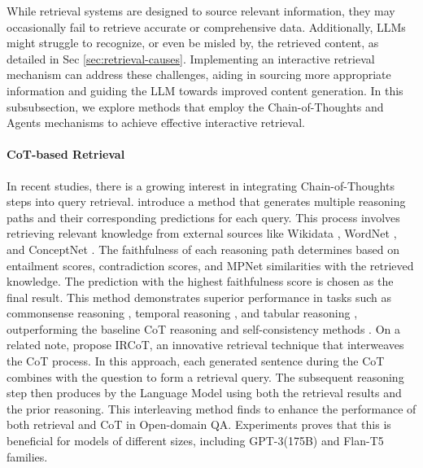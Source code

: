 While retrieval systems are designed to source relevant information, they may occasionally fail to retrieve accurate or comprehensive data. Additionally, LLMs might struggle to recognize, or even be misled by, the retrieved content, as detailed in Sec \ref{sec:retrieval-causes}. Implementing an interactive retrieval mechanism can address these challenges, aiding in sourcing more appropriate information and guiding the LLM towards improved content generation.
In this subsubsection, we explore methods that employ the Chain-of-Thoughts and Agents mechanisms to achieve effective interactive retrieval.

\paragraph{\textbf{CoT-based Retrieval}}
In recent studies, there is a growing interest in integrating Chain-of-Thoughts \citep{CoT} steps into query retrieval. \citet{he2022rethinking} introduce a method that generates multiple reasoning paths and their corresponding predictions for each query. This process involves retrieving relevant knowledge from external sources like Wikidata \citep{wikidata}, WordNet \citep{wordnet}, and ConceptNet \citep{conceptnet}. The faithfulness of each reasoning path determines based on entailment scores, contradiction scores, and MPNet similarities \citep{mpnet} with the retrieved knowledge. The prediction with the highest faithfulness score is chosen as the final result. This method demonstrates superior performance in tasks such as commonsense reasoning \citep{geva2021did}, temporal reasoning \citep{TempQuestions}, and tabular reasoning \citep{gupta2020infotabs}, outperforming the baseline CoT reasoning and self-consistency methods \citep{wang2023selfconsistency}. On a related note, \citet{trivedi-etal-2023-interleaving} propose IRCoT, an innovative retrieval technique that interweaves the CoT process. In this approach, each generated sentence during the CoT combines with the question to form a retrieval query. The subsequent reasoning step then produces by the Language Model using both the retrieval results and the prior reasoning. This interleaving method finds to enhance the performance of both retrieval and CoT in Open-domain QA. Experiments proves that this is beneficial for models of different sizes, including GPT-3(175B) \citep{GPT-3} and Flan-T5 \citep{chung2022scaling} families.

